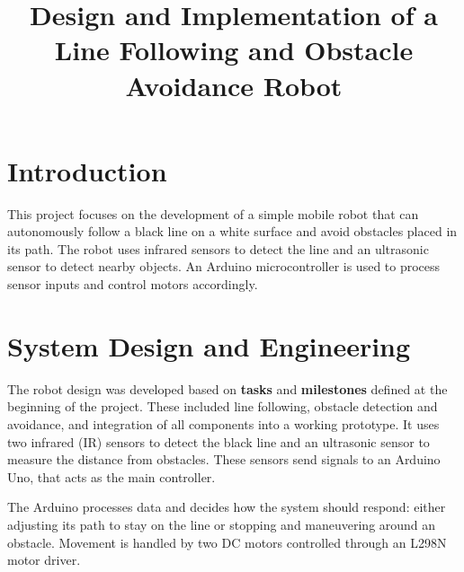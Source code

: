 \documentclass[conference]{IEEEtran}
\begin{document}
\title{Design and Implementation of a Line Following and Obstacle Avoidance Robot}

\author{
}

\maketitle



\section{Introduction}
This project focuses on the development of a simple mobile robot that can autonomously follow a black line on a white surface and avoid obstacles placed in its path. The robot uses infrared sensors to detect the line and an ultrasonic sensor to detect nearby objects. An Arduino microcontroller is used to process sensor inputs and control motors accordingly.


\section{System Design and Engineering}
The robot design was developed based on \textbf{tasks} and \textbf{milestones} defined at the beginning of the project. These included line following, obstacle detection and avoidance, and integration of all components into a working prototype. It uses two infrared (IR) sensors to detect the black line and an ultrasonic sensor to measure the distance from obstacles. These sensors send signals to an Arduino Uno, that acts as the main controller.

The Arduino processes data and decides how the system should respond: either adjusting its path to stay on the line or stopping and maneuvering around an obstacle. Movement is handled by two DC motors controlled through an L298N motor driver.
\end{document}
